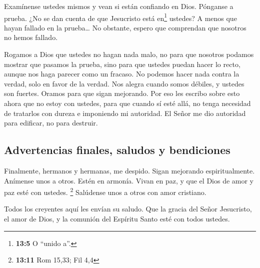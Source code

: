 Examínense ustedes mismos y vean si están confiando en
Dios. Pónganse a prueba. ¿No se dan cuenta de que Jesucristo está
en\footnote{\textbf{13:5} O ``unido a''.} ustedes? A menos que hayan
fallado en la prueba\ldots{}  No obstante, espero que
comprendan que nosotros no hemos fallado.

 Rogamos a Dios que ustedes no hagan nada malo, no para
que nosotros podamos mostrar que pasamos la prueba, sino para que
ustedes puedan hacer lo recto, aunque nos haga parecer como un fracaso.
 No podemos hacer nada contra la verdad, solo en favor de
la verdad.  Nos alegra cuando somos débiles, y ustedes son
fuertes. Oramos para que sigan mejorando.  Por eso les
escribo sobre esto ahora que no estoy con ustedes, para que cuando sí
esté allá, no tenga necesidad de tratarlos con dureza e imponiendo mi
autoridad. El Señor me dio autoridad para edificar, no para destruir.

\hypertarget{advertencias-finales-saludos-y-bendiciones}{%
\subsection{Advertencias finales, saludos y
bendiciones}\label{advertencias-finales-saludos-y-bendiciones}}

 Finalmente, hermanos y hermanas, me despido. Sigan
mejorando espiritualmente. Anímense unos a otros. Estén en armonía.
Vivan en paz, y que el Dios de amor y paz esté con ustedes. \footnote{\textbf{13:11}
  Rom 15,33; Fil 4,4}  Salúdense unos a otros con amor
cristiano.

 Todos los creyentes aquí les envían su saludo.
 Que la gracia del Señor Jesucristo, el amor de Dios, y
la comunión del Espíritu Santo esté con todos ustedes.
